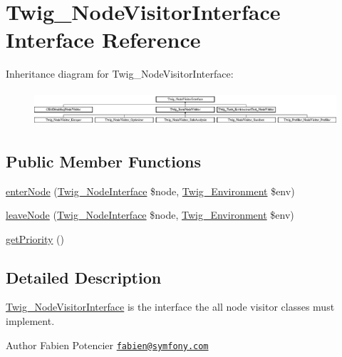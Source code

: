 \hypertarget{interfaceTwig__NodeVisitorInterface}{}\section{Twig\+\_\+\+Node\+Visitor\+Interface Interface Reference}
\label{interfaceTwig__NodeVisitorInterface}
Inheritance diagram for Twig\+\_\+\+Node\+Visitor\+Interface\+:\begin{figure}[H]
\begin{center}
\leavevmode
\includegraphics[height=1.317647cm]{interfaceTwig__NodeVisitorInterface}
\end{center}
\end{figure}
\subsection*{Public Member Functions}
\begin{DoxyCompactItemize}
\item 
\hyperlink{interfaceTwig__NodeVisitorInterface_a2113528cfac7a5e17857a7c38115e273}{enter\+Node} (\hyperlink{interfaceTwig__NodeInterface}{Twig\+\_\+\+Node\+Interface} \$node, \hyperlink{classTwig__Environment}{Twig\+\_\+\+Environment} \$env)
\item 
\hyperlink{interfaceTwig__NodeVisitorInterface_aa37d1e8e98eb720fc633a9031f8af4a8}{leave\+Node} (\hyperlink{interfaceTwig__NodeInterface}{Twig\+\_\+\+Node\+Interface} \$node, \hyperlink{classTwig__Environment}{Twig\+\_\+\+Environment} \$env)
\item 
\hyperlink{interfaceTwig__NodeVisitorInterface_a9ad5ef7f873c47ded2423071fa3218d3}{get\+Priority} ()
\end{DoxyCompactItemize}


\subsection{Detailed Description}
\hyperlink{interfaceTwig__NodeVisitorInterface}{Twig\+\_\+\+Node\+Visitor\+Interface} is the interface the all node visitor classes must implement.

\begin{DoxyAuthor}{Author}
Fabien Potencier \href{mailto:fabien@symfony.com}{\tt fabien@symfony.\+com} 
\end{DoxyAuthor}


